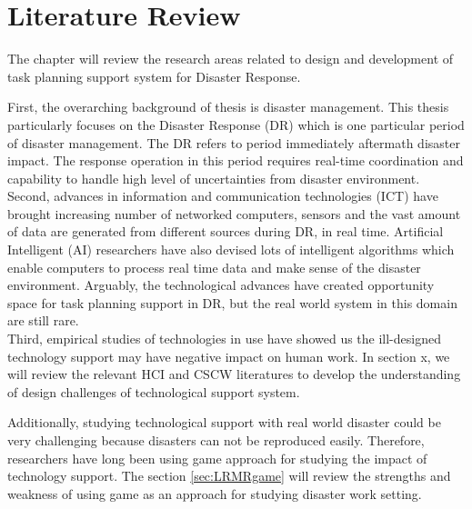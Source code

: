 \chapter{Literature Review}\label{ch:examples}
The chapter will review the research areas related to design and development of task planning support system for Disaster Response. 

First, the overarching background of thesis is disaster management. This thesis particularly focuses on the Disaster Response (DR) which is one particular period of disaster management. The DR refers to period immediately aftermath disaster impact. The response operation in this period requires real-time coordination and capability to handle high level of uncertainties from disaster environment.\\

Second, advances in information and communication technologies (ICT)  have brought increasing number of networked computers, sensors and the vast amount of data are generated from different sources during DR, in real time. Artificial Intelligent (AI) researchers have also devised lots of intelligent algorithms which enable computers to process real time data and make sense of the disaster environment. Arguably, the technological advances have created opportunity space for task planning support in DR, but the real world system in this domain are still rare.\\

Third, empirical studies of technologies in use have showed us the ill-designed technology support may have negative impact on human work. In section x, we will review the relevant HCI and CSCW literatures to develop the understanding of design challenges of technological support system.  

Additionally, studying technological support with real world disaster could be very challenging because disasters can not be reproduced easily. Therefore, researchers have long been using game approach for studying the impact of technology support.  The section \ref{sec:LRMRgame} will review the strengths and weakness of using game as an approach for studying disaster work setting. \\

